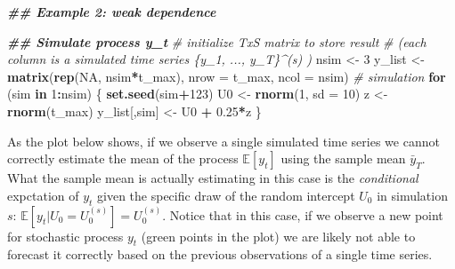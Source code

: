 \documentclass[
]{book}
\newenvironment{Shaded}{\begin{snugshade}}{\end{snugshade}}
\newcommand{\AttributeTok}[1]{\textcolor[rgb]{0.13,0.29,0.53}{#1}}
\newcommand{\CommentTok}[1]{\textcolor[rgb]{0.56,0.35,0.01}{\textit{#1}}}
\newcommand{\ConstantTok}[1]{\textcolor[rgb]{0.56,0.35,0.01}{#1}}
\newcommand{\ControlFlowTok}[1]{\textcolor[rgb]{0.13,0.29,0.53}{\textbf{#1}}}
\newcommand{\DecValTok}[1]{\textcolor[rgb]{0.00,0.00,0.81}{#1}}
\newcommand{\DocumentationTok}[1]{\textcolor[rgb]{0.56,0.35,0.01}{\textbf{\textit{#1}}}}
\newcommand{\FloatTok}[1]{\textcolor[rgb]{0.00,0.00,0.81}{#1}}
\newcommand{\FunctionTok}[1]{\textcolor[rgb]{0.13,0.29,0.53}{\textbf{#1}}}
\newcommand{\NormalTok}[1]{#1}
\newcommand{\OtherTok}[1]{\textcolor[rgb]{0.56,0.35,0.01}{#1}}
\newcommand{\SpecialCharTok}[1]{\textcolor[rgb]{0.81,0.36,0.00}{\textbf{#1}}}
\begin{document}
\begin{Shaded}
\begin{Highlighting}[]
\DocumentationTok{\#\# Example 2: weak dependence}

\DocumentationTok{\#\# Simulate process y\_t}
\CommentTok{\# initialize TxS matrix to store result }
\CommentTok{\# (each column is a simulated time series \{y\_1, ..., y\_T\}\^{}(s) )}
\NormalTok{nsim }\OtherTok{\textless{}{-}} \DecValTok{3}
\NormalTok{y\_list }\OtherTok{\textless{}{-}} \FunctionTok{matrix}\NormalTok{(}\FunctionTok{rep}\NormalTok{(}\ConstantTok{NA}\NormalTok{, nsim}\SpecialCharTok{*}\NormalTok{t\_max), }\AttributeTok{nrow =}\NormalTok{ t\_max, }\AttributeTok{ncol =}\NormalTok{ nsim)}
\CommentTok{\# simulation}
\ControlFlowTok{for}\NormalTok{ (sim }\ControlFlowTok{in} \DecValTok{1}\SpecialCharTok{:}\NormalTok{nsim) \{}
  \FunctionTok{set.seed}\NormalTok{(sim}\SpecialCharTok{+}\DecValTok{123}\NormalTok{)}
\NormalTok{  U0 }\OtherTok{\textless{}{-}} \FunctionTok{rnorm}\NormalTok{(}\DecValTok{1}\NormalTok{, }\AttributeTok{sd =} \DecValTok{10}\NormalTok{)}
\NormalTok{  z  }\OtherTok{\textless{}{-}} \FunctionTok{rnorm}\NormalTok{(t\_max)}
\NormalTok{  y\_list[,sim] }\OtherTok{\textless{}{-}}\NormalTok{ U0 }\SpecialCharTok{+} \FloatTok{0.25}\SpecialCharTok{*}\NormalTok{z}
\NormalTok{\}}
\end{Highlighting}
\end{Shaded}

As the plot below shows, if we observe a single simulated time series we cannot correctly estimate the mean of the process \(\mathbb{E}[y_t]\) using the sample mean \(\bar{y}_T\). What the sample mean is actually estimating in this case is the \emph{conditional} expctation of \(y_t\) given the specific draw of the random intercept \(U_0\) in simulation \(s\): \(\mathbb{E}\left[y_t | U_0 = U_0^{(s)}\right] = U_0^{(s)}\). Notice that in this case, if we observe a new point for stochastic process \(y_t\) (green points in the plot) we are likely not able to forecast it correctly based on the previous observations of a single time series.
\end{document}
